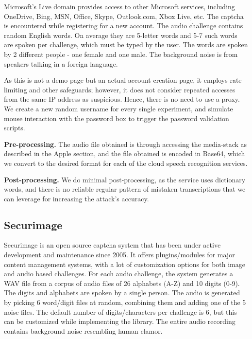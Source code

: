 Microsoft's Live domain provides access to other Microsoft services, including
OneDrive, Bing, MSN, Office, Skype, Outlook.com, Xbox Live, etc. The captcha is 
encountered while registering for a new account. The audio challenge contains random English 
words. On average they are 5-letter words and 5-7 such words are spoken per challenge, which must be typed by the user.
The words are spoken by 2 different people - one female and one male. The background noise 
is from speakers talking in a foreign language.

As this is not a demo page but an actual account creation page, it employs rate limiting and other safeguards; however, it 
does not consider repeated accesses from the same IP address as suspicious. Hence, there is no need to use a proxy. 
We create a new random username for every single experiment, and simulate mouse interaction with the password box to 
trigger the password validation scripts. %

\textbf{Pre-processing.} The audio file obtained is through accessing the media-stack as described in the Apple section, 
and the file obtained is encoded in Base64, which we convert to the desired format for each of the cloud speech recognition services.

\textbf{Post-processing.} We do minimal post-processing, as the service uses dictionary words, and there is no reliable regular 
pattern of mistaken transcriptions that we can leverage for increasing the attack's accuracy.


\subsection{Securimage}

Securimage is an open source captcha system that has been under active development and maintenance 
since 2005. It offers plugins/modules for major content management systems, with a lot of customization 
options for both image and audio based challenges. For each audio challenge, the system generates a WAV 
file from a corpus of audio files of 26 alphabets (A-Z) and 10 digits (0-9). The digits and alphabets are 
spoken by a single person. The audio is generated by picking 6 word/digit files at random, combining them and adding one 
of the 5 noise files. The default number of digits/characters per challenge is 6, but this can 
be customized while implementing the library. The entire audio recording contains background noise resembling
human clamor.

